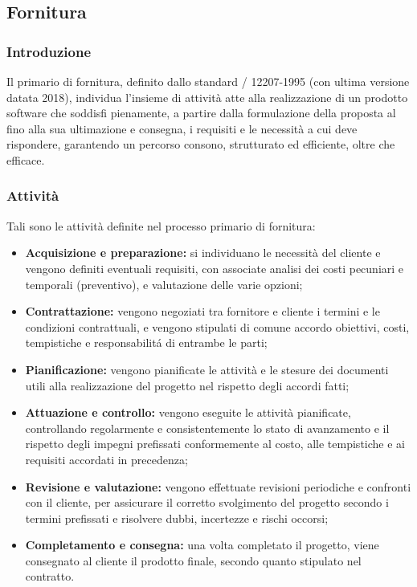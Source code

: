 
\subsection{Fornitura}

\subsubsection{Introduzione}
Il  primario di fornitura, definito dallo standard
/ 12207-1995 (con ultima versione datata 2018), individua l'insieme di
attività atte alla realizzazione di un prodotto software che soddisfi pienamente, a partire dalla
formulazione della proposta al  fino alla sua ultimazione e consegna, i requisiti e le necessità a cui deve rispondere, garantendo un percorso consono, strutturato ed efficiente, oltre che efficace.

\subsubsection{Attività}
Tali sono le attività definite nel processo primario di fornitura:

\begin{itemize}
    \item \textbf{Acquisizione e preparazione:} si individuano le necessità del cliente e vengono definiti eventuali requisiti, con associate analisi dei costi pecuniari e temporali (preventivo), e valutazione delle varie opzioni;
    \item \textbf{Contrattazione:} vengono negoziati tra fornitore e cliente i termini e le condizioni contrattuali, e vengono stipulati di comune accordo obiettivi, costi, tempistiche e responsabilitá di entrambe le parti;
    \item \textbf{Pianificazione:} vengono pianificate le attività e le stesure dei documenti utili alla realizzazione del progetto nel rispetto degli accordi fatti;
    \item \textbf{Attuazione e controllo:} vengono eseguite le attività pianificate, controllando regolarmente e consistentemente lo stato di avanzamento e il rispetto degli impegni prefissati conformemente al costo, alle tempistiche e ai requisiti accordati in precedenza;
    \item \textbf{Revisione e valutazione:} vengono effettuate revisioni periodiche e confronti con il cliente, per assicurare il corretto svolgimento del progetto secondo i termini prefissati e risolvere dubbi, incertezze e rischi occorsi;
    \item \textbf{Completamento e consegna:} una volta completato il progetto, viene consegnato al cliente il prodotto finale, secondo quanto stipulato nel contratto.
\end{itemize}

